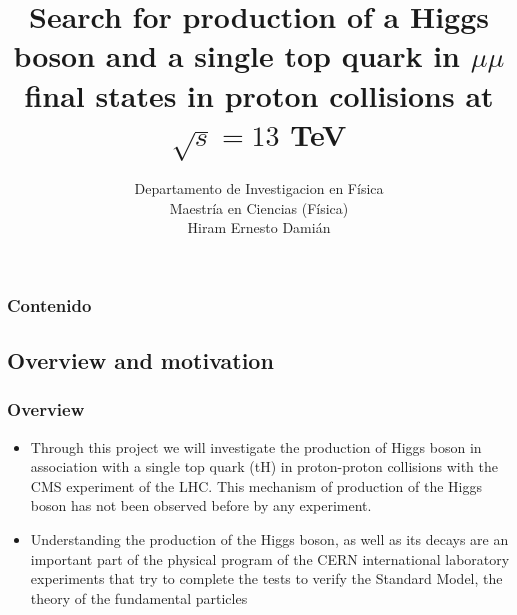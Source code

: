 \documentclass[11pt]{beamer}
\begin{document}
	\author{
		Departamento de Investigacion en F\'isica \\
		Maestr\'ia en Ciencias (F\'isica)\\
		Hiram Ernesto Dami\'an}
	\title{Search for production of a Higgs boson and a single top quark in $\mu\mu$ final states in proton collisions at $\sqrt{s}=13$ TeV}
	\newcommand{\nologo}{\setbeamertemplate{logo}{}}
	\newcommand{\subf}[2]{%
		{\small\begin{tabular}[t]{@{}c@{}}
				#1\\#2
		\end{tabular}}%
	}
	\begin{frame}
	\titlepage
\end{frame}

\begin{frame}
\tableofcontents
\frametitle{Contenido}
\end{frame}


\begin{frame}
\section{Overview and motivation}
\frametitle{Overview}
\begin{itemize}
\item Through this project we will investigate the production of Higgs boson in association with a
single top quark (tH) in proton-proton collisions with the CMS experiment of the LHC. This
mechanism of production of the Higgs boson has not been observed before by any
experiment.

\item Understanding the production of the Higgs boson, as well as its decays are an important part
of the physical program of the CERN international laboratory experiments that try to complete
the tests to verify the Standard Model, the theory of the fundamental particles

\end{itemize}
\end{frame}
\end{document}
